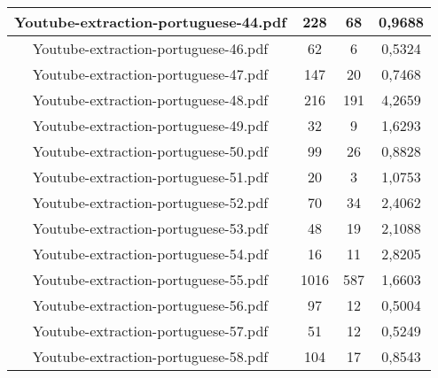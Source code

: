 \documentclass[11pt]{article}
\newlength\mylength
\begin{document}
\begin{center}
\begin{longtable}{||C{.40\mylength}||C{.30\mylength}||C{.30\mylength}||C{.30\mylength}||}
  Youtube-extraction-portuguese-44.pdf & 228 & 68 & 0,9688 \\  \hline
  Youtube-extraction-portuguese-46.pdf & 62 & 6 & 0,5324 \\  \hline
  Youtube-extraction-portuguese-47.pdf & 147 & 20 & 0,7468 \\  \hline
  Youtube-extraction-portuguese-48.pdf & 216 & 191 & 4,2659 \\  \hline
  Youtube-extraction-portuguese-49.pdf & 32 & 9 & 1,6293 \\  \hline
  Youtube-extraction-portuguese-50.pdf & 99 & 26 & 0,8828 \\  \hline
  Youtube-extraction-portuguese-51.pdf & 20 & 3 & 1,0753 \\  \hline
  Youtube-extraction-portuguese-52.pdf & 70 & 34 & 2,4062 \\  \hline
  Youtube-extraction-portuguese-53.pdf & 48 & 19 & 2,1088 \\  \hline
  Youtube-extraction-portuguese-54.pdf & 16 & 11 & 2,8205 \\  \hline
  Youtube-extraction-portuguese-55.pdf & 1016 & 587 & 1,6603 \\  \hline
  Youtube-extraction-portuguese-56.pdf & 97 & 12 & 0,5004 \\  \hline
  Youtube-extraction-portuguese-57.pdf & 51 & 12 & 0,5249 \\  \hline
  Youtube-extraction-portuguese-58.pdf & 104 & 17 & 0,8543 \\  \hline

\end{longtable}
\end{center}
\end{document}
